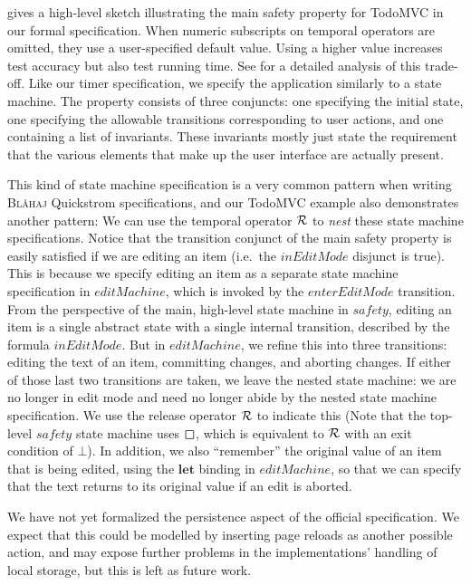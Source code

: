 \documentclass[sigplan,nonacm,10pt]{acmart}
\makeatletter
\newcommand{\Quickstrom}[0]{%
  \if@ACM@anonymous%
  \textsc{Bl\aa{}haj}%
  \else%
  Quickstrom%
  \fi\xspace}
\newcommand{\Always}{\operatorname{%
  \tikz[baseline]{
    \draw[draw=white] (-0.2ex,0ex) -- (1.7ex,0ex);
    \draw[line width=.12ex,line join=round]
      (0ex,-.2ex) -- (0ex,1.3ex) -- (1.5ex,1.3ex) -- (1.5ex,.-.2ex) -- cycle;
  }}}{}
\newcommand{\Release}{\mathbin{%
  \mathcal{R}}}{}
\makeatother
\begin{document}
 gives a high-level sketch illustrating the main safety property for TodoMVC in our formal specification. When numeric subscripts on temporal operators
are omitted, they use a user-specified default value. Using a higher value increases test accuracy but also test running time. See  for a detailed analysis 
of this trade-off.
Like our timer specification, we specify the application similarly to a state machine. The property consists of three conjuncts: one specifying the initial state,
one specifying the allowable transitions corresponding to user actions, and one containing a list of invariants. These invariants mostly just state the requirement
that the various elements that make up the user interface are actually present.

This kind of state machine specification is a very common pattern when writing \Quickstrom specifications, and our TodoMVC example also demonstrates another pattern: We can use the temporal
operator $\Release$ to \emph{nest} these state machine specifications. Notice that the transition conjunct of the main safety property is easily satisfied if we are editing an item (i.e.\ the $\mathit{inEditMode}$ disjunct is true).
This is because we specify editing an item as a separate state machine specification in $\mathit{editMachine}$, which is invoked by the $\mathit{enterEditMode}$ transition.  From the perspective of the main, high-level state machine in $\mathit{safety}$, editing an item
is a single abstract state with a single internal transition, described by the formula $\mathit{inEditMode}$. But in $\mathit{editMachine}$, we refine this into three transitions: editing the text of an item, committing changes, and aborting changes.
If either of those last two transitions are taken, we leave the nested state machine: we are no longer in edit mode and need no longer abide by the nested
state machine specification.  We use the release operator $\Release$ to indicate this (Note that the top-level $\mathit{safety}$ state machine uses $\Always$, which is equivalent to $\Release$ with an exit condition of $\bot$).
In addition, we also ``remember'' the original value of an item that is being edited, using the $\textbf{let}$ binding in $\mathit{editMachine}$, so that we can specify that the text returns to its original value if an edit is aborted.


    We have not yet formalized the persistence aspect of the official specification. We expect that this could be modelled by
    inserting page reloads as another possible action, and may expose further problems in the implementations' handling of local storage,
    but this is left as future work.
\end{document}

